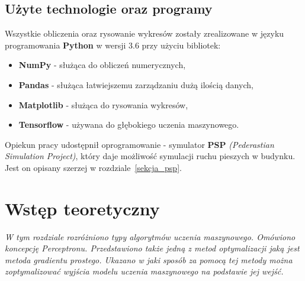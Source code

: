\documentclass[12pt]{aghdpl}
\begin{document}
		\section{Użyte technologie oraz programy}
		Wszystkie obliczenia oraz rysowanie wykresów zostały zrealizowane w języku programowania \textbf{Python} w wersji 3.6 przy użyciu bibliotek:
		\begin{itemize}
			\item \textbf{NumPy} - służąca do obliczeń numerycznych,
			\item \textbf{Pandas} - służąca łatwiejszemu zarządzaniu dużą ilością danych,
			\item \textbf{Matplotlib} - służąca do rysowania wykresów,
			\item \textbf{Tensorflow} - używana do głębokiego uczenia maszynowego.
		\end{itemize}
		
		Opiekun pracy udostępnił oprogramowanie - symulator \textbf{PSP} \textit{(Pederastian Simulation Project)}, który daje możliwość symulacji ruchu pieszych w budynku. Jest on opisany szerzej w rozdziale~\ref{sekcja_psp}.
		
	\chapter{Wstęp teoretyczny}
	\textit{W tym rozdziale rozróżniono typy algorytmów uczenia maszynowego. Omówiono koncepcję Perceptronu. Przedstawiono także jedną z metod optymalizacji jaką jest metoda gradientu prostego. Ukazano w jaki sposób za pomocą tej metody można zoptymalizować wyjścia modelu uczenia maszynowego na podstawie jej wejść.}
	
\end{document}
